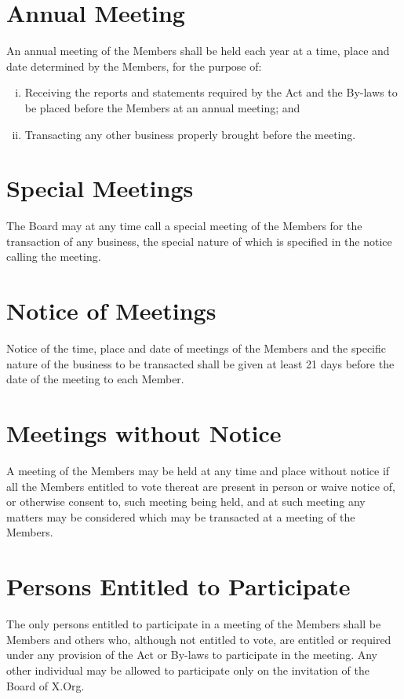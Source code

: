 \documentclass[10pt, english]{bylaws}
\begin{document}

\section{Annual Meeting}
An annual meeting of the Members shall be held each year at a time, place and
date determined by the Members, for the purpose of:

\begin{enumerate}[(i)\hspace{.2cm}]
	\item Receiving the reports and statements required by the Act and the
	By-laws to be placed before the Members at an annual meeting; and

	\item Transacting any other business properly brought before the
	meeting.
\end{enumerate}


\section{Special Meetings}
The Board may at any time call a special meeting of the Members for
the transaction of any business, the special nature of which is specified in
the notice calling the meeting.

\section{Notice of Meetings}
Notice of the time, place and date of meetings of the Members and the specific
nature of the business to be transacted shall be given at least 21 days before
the date of the meeting to each Member.

\section{Meetings without Notice}
A meeting of the Members may be held at any time and place without notice if all
the Members entitled to vote thereat are present in person or waive notice of,
or otherwise consent to, such meeting being held, and at such meeting any
matters may be considered which may be transacted at a meeting of the Members.

\section{Persons Entitled to Participate}
The only persons entitled to participate in a meeting of the Members shall be
Members and others who, although not entitled to vote, are entitled or required
under any provision of the Act or By-laws to participate in the meeting. Any
other individual may be allowed to participate only on the invitation of the
Board of X.Org.
\end{document}
